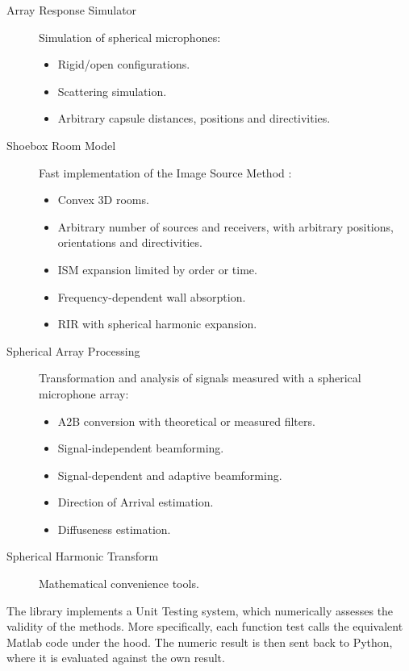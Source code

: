 \begin{description}

	\item [Array Response Simulator] Simulation of
spherical microphones:
	\begin{itemize}
		\item Rigid/open configurations.
		\item Scattering simulation.
		\item Arbitrary capsule distances, positions and directivities.
	\end{itemize}
	
	\item [Shoebox Room Model] Fast implementation of the Image Source Method \cite{imagemethod}:
	\begin{itemize}
		\item Convex 3D rooms.
		\item Arbitrary number of sources and receivers, with arbitrary positions, orientations and directivities.
		\item ISM expansion limited by order or time.
		\item Frequency-dependent wall absorption.
		\item RIR with spherical harmonic expansion.
	\end{itemize}
	
	\item [Spherical Array Processing] Transformation and analysis of signals measured with a spherical microphone array:
	\begin{itemize}
		\item A2B conversion with theoretical or measured filters.
		\item Signal-independent beamforming.
		\item Signal-dependent and adaptive beamforming.
		\item Direction of Arrival estimation.
		\item Diffuseness estimation.
	\end{itemize}
	
	\item [Spherical Harmonic Transform] Mathematical convenience tools.
\end{description}

The library implements a Unit Testing system, which numerically assesses the validity of the methods. 
More specifically, each function test calls the equivalent Matlab code under the hood. The numeric result is then sent back to Python, where
it is evaluated against the own result.\\

